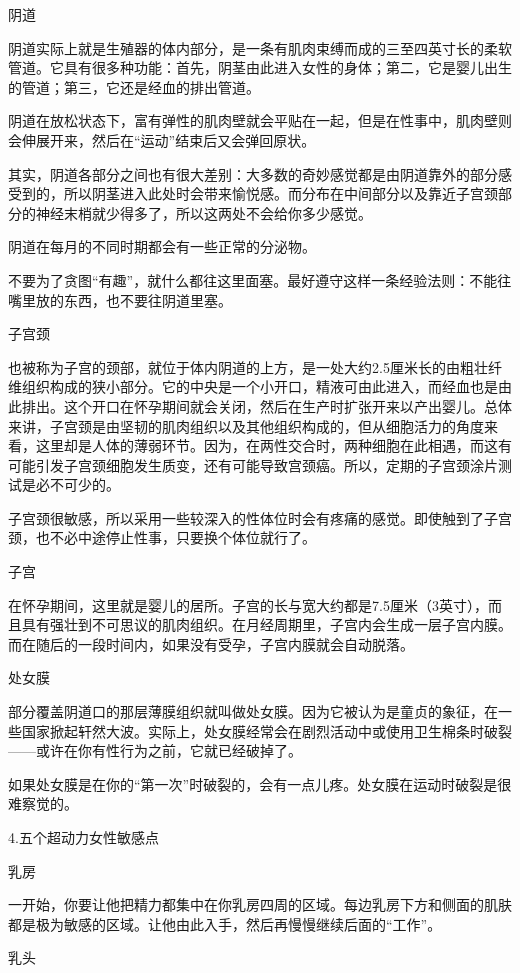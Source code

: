 \documentclass[12pt,UTF8,openany]{ctexbook}
\begin{document}
阴道

阴道实际上就是生殖器的体内部分，是一条有肌肉束缚而成的三至四英寸长的柔软管道。它具有很多种功能：首先，阴茎由此进入女性的身体；第二，它是婴儿出生的管道；第三，它还是经血的排出管道。

阴道在放松状态下，富有弹性的肌肉壁就会平贴在一起，但是在性事中，肌肉壁则会伸展开来，然后在“运动”结束后又会弹回原状。

其实，阴道各部分之间也有很大差别：大多数的奇妙感觉都是由阴道靠外的部分感受到的，所以阴茎进入此处时会带来愉悦感。而分布在中间部分以及靠近子宫颈部分的神经末梢就少得多了，所以这两处不会给你多少感觉。

阴道在每月的不同时期都会有一些正常的分泌物。

不要为了贪图“有趣”，就什么都往这里面塞。最好遵守这样一条经验法则：不能往嘴里放的东西，也不要往阴道里塞。

子宫颈

也被称为子宫的颈部，就位于体内阴道的上方，是一处大约2.5厘米长的由粗壮纤维组织构成的狭小部分。它的中央是一个小开口，精液可由此进入，而经血也是由此排出。这个开口在怀孕期间就会关闭，然后在生产时扩张开来以产出婴儿。总体来讲，子宫颈是由坚韧的肌肉组织以及其他组织构成的，但从细胞活力的角度来看，这里却是人体的薄弱环节。因为，在两性交合时，两种细胞在此相遇，而这有可能引发子宫颈细胞发生质变，还有可能导致宫颈癌。所以，定期的子宫颈涂片测试是必不可少的。

子宫颈很敏感，所以采用一些较深入的性体位时会有疼痛的感觉。即使触到了子宫颈，也不必中途停止性事，只要换个体位就行了。

子宫

在怀孕期间，这里就是婴儿的居所。子宫的长与宽大约都是7.5厘米（3英寸），而且具有强壮到不可思议的肌肉组织。在月经周期里，子宫内会生成一层子宫内膜。而在随后的一段时间内，如果没有受孕，子宫内膜就会自动脱落。

处女膜

部分覆盖阴道口的那层薄膜组织就叫做处女膜。因为它被认为是童贞的象征，在一些国家掀起轩然大波。实际上，处女膜经常会在剧烈活动中或使用卫生棉条时破裂——或许在你有性行为之前，它就已经破掉了。

如果处女膜是在你的“第一次”时破裂的，会有一点儿疼。处女膜在运动时破裂是很难察觉的。

4.五个超动力女性敏感点

乳房

一开始，你要让他把精力都集中在你乳房四周的区域。每边乳房下方和侧面的肌肤都是极为敏感的区域。让他由此入手，然后再慢慢继续后面的“工作”。

乳头
\end{document}
